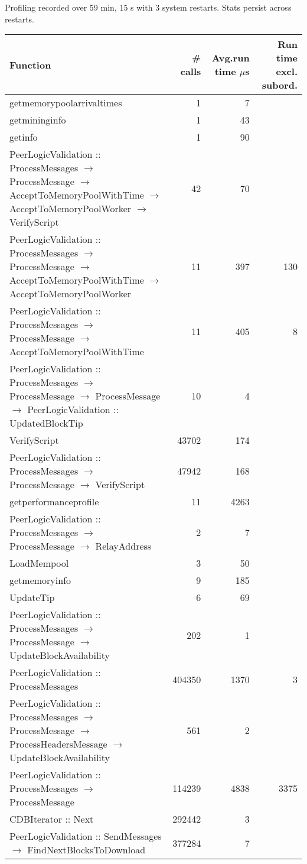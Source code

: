 \documentclass{article}
\begin{document}
Profiling recorded over 59 min, 15 s with 3 system restarts. Stats persist across restarts.

\begin{tabular}{P{5cm}|r|r|r}
Function&\# calls& Avg.run time $\mu$s& Run time excl. subord. \\\hline
getmemorypoolarrivaltimes& 1& 7&\\\hline
getmininginfo& 1& 43&\\\hline
getinfo& 1& 90&\\\hline
PeerLogicValidation :: ProcessMessages $\to$ ProcessMessage $\to$ AcceptToMemoryPoolWithTime $\to$ AcceptToMemoryPoolWorker $\to$ VerifyScript& 42& 70&\\\hline
PeerLogicValidation :: ProcessMessages $\to$ ProcessMessage $\to$ AcceptToMemoryPoolWithTime $\to$ AcceptToMemoryPoolWorker& 11& 397&130\\\hline
PeerLogicValidation :: ProcessMessages $\to$ ProcessMessage $\to$ AcceptToMemoryPoolWithTime& 11& 405&8\\\hline
PeerLogicValidation :: ProcessMessages $\to$ ProcessMessage $\to$ ProcessMessage $\to$ PeerLogicValidation :: UpdatedBlockTip& 10& 4&\\\hline
VerifyScript& 43702& 174&\\\hline
PeerLogicValidation :: ProcessMessages $\to$ ProcessMessage $\to$ VerifyScript& 47942& 168&\\\hline
getperformanceprofile& 11& 4263&\\\hline
PeerLogicValidation :: ProcessMessages $\to$ ProcessMessage $\to$ RelayAddress& 2& 7&\\\hline
LoadMempool& 3& 50&\\\hline
getmemoryinfo& 9& 185&\\\hline
UpdateTip& 6& 69&\\\hline
PeerLogicValidation :: ProcessMessages $\to$ ProcessMessage $\to$ UpdateBlockAvailability& 202& 1&\\\hline
PeerLogicValidation :: ProcessMessages& 404350& 1370&3\\\hline
PeerLogicValidation :: ProcessMessages $\to$ ProcessMessage $\to$ ProcessHeadersMessage $\to$ UpdateBlockAvailability& 561& 2&\\\hline
PeerLogicValidation :: ProcessMessages $\to$ ProcessMessage& 114239& 4838&3375\\\hline
CDBIterator :: Next& 292442& 3&\\\hline
PeerLogicValidation :: SendMessages $\to$ FindNextBlocksToDownload& 377284& 7&\\\hline

\end{tabular}
\end{document}
